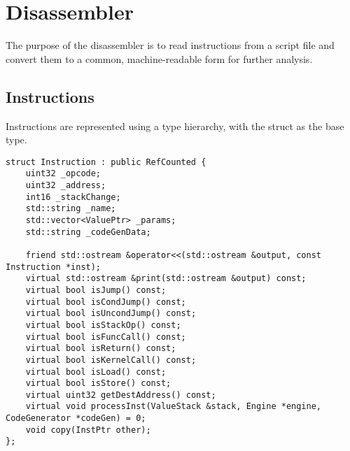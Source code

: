 \section{Disassembler}
\label{sec:disassembler}
The purpose of the disassembler is to read instructions from a script file and convert them to a common, machine-readable form for further analysis.

\subsection{Instructions}
\label{sec:instructions}
Instructions are represented using a type hierarchy, with the  struct as the base type.

\begin{C++}
\begin{lstlisting}
struct Instruction : public RefCounted {
	uint32 _opcode;
	uint32 _address;
	int16 _stackChange;
	std::string _name;
	std::vector<ValuePtr> _params;
	std::string _codeGenData;

	friend std::ostream &operator<<(std::ostream &output, const Instruction *inst);
	virtual std::ostream &print(std::ostream &output) const;
	virtual bool isJump() const;
	virtual bool isCondJump() const;
	virtual bool isUncondJump() const;
	virtual bool isStackOp() const;
	virtual bool isFuncCall() const;
	virtual bool isReturn() const;
	virtual bool isKernelCall() const;
	virtual bool isLoad() const;
	virtual bool isStore() const;
	virtual uint32 getDestAddress() const;
	virtual void processInst(ValueStack &stack, Engine *engine, CodeGenerator *codeGen) = 0;
	void copy(InstPtr other);
};
\end{lstlisting}
\end{C++}

